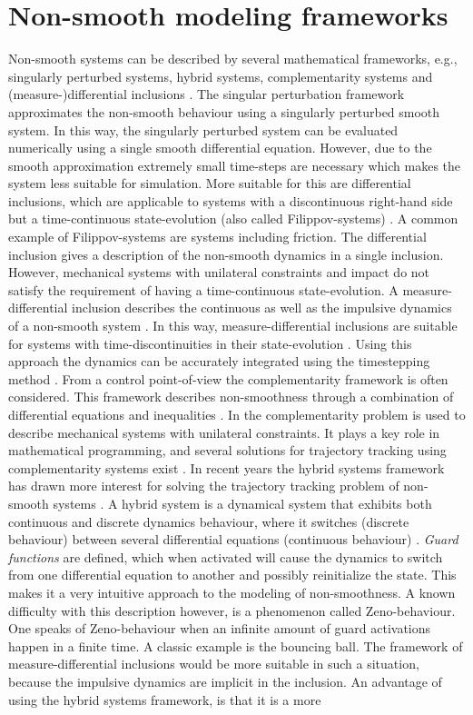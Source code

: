 \documentclass[../DC2017114Bouma.tex]{subfiles}
\begin{document}
\section{Non-smooth modeling frameworks}
Non-smooth systems can be described by several mathematical frameworks, e.g., singularly perturbed systems, hybrid systems, complementarity systems and (measure-)differential inclusions \cite{Leine2004}. The singular perturbation framework approximates the non-smooth behaviour using a singularly perturbed smooth system. In this way, the singularly perturbed system can be evaluated numerically using a single smooth differential equation. However, due to the smooth approximation extremely small time-steps are necessary which makes the system less suitable for simulation. More suitable for this are differential inclusions, which are applicable to systems with a discontinuous right-hand side but a time-continuous state-evolution (also called Filippov-systems) \cite{Filippov1988}. A common example of Filippov-systems are systems including friction. The differential inclusion gives a description of the non-smooth dynamics in a single inclusion. However, mechanical systems with unilateral constraints and impact do not satisfy the requirement of having a time-continuous state-evolution. A measure-differential inclusion describes the continuous as well as the impulsive dynamics of a non-smooth system \cite{Leine2008b}. In this way, measure-differential inclusions are suitable for systems with time-discontinuities in their state-evolution \cite{Moreau1988,Brogliato1999}. Using this approach the dynamics can be accurately integrated using the timestepping method \cite{Wouwa}. From a control point-of-view the complementarity framework is often considered. This framework describes non-smoothness through a combination of differential equations and inequalities \cite{VanDerSchaft1998,Heemels1999}. In \cite{Glocker2001} the complementarity problem is used to describe mechanical systems with unilateral constraints. It plays a key role in mathematical programming, and several solutions for trajectory tracking using complementarity systems exist \cite{Bourgeot2005,Morarescu2010}. In recent years the hybrid systems framework has drawn more interest for solving the trajectory tracking problem of non-smooth systems \cite{Hyun2014,Morris2009}. A hybrid system is a dynamical system that exhibits both continuous and discrete dynamics behaviour, where it switches (discrete behaviour) between several differential equations (continuous behaviour) \cite{Goebel2009}. \textit{Guard functions} are defined, which when activated will cause the dynamics to switch from one differential equation to another and possibly reinitialize the state. This makes it a very intuitive approach to the modeling of non-smoothness. A known difficulty with this description however, is a phenomenon called Zeno-behaviour. One speaks of Zeno-behaviour when an infinite amount of guard activations happen in a finite time. A classic example is the bouncing ball. The framework of measure-differential inclusions would be more suitable in such a situation, because the impulsive dynamics are implicit in the inclusion. An advantage of using the hybrid systems framework, is that it is a more 
\end{document}
